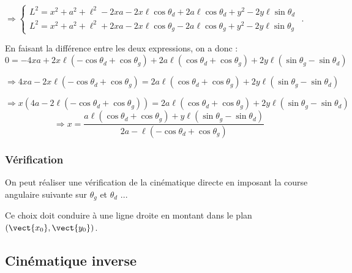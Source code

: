 \documentclass[10pt,fleqn]{article} %
\begin{document}
$
\Rightarrow
\left\{
\begin{array}{l}
L^2 = x^2  +a^2+\ell^2  -2xa -2x\ell\cos\theta_d+2a\ell\cos\theta_d  +  y^2 - 2y \ell   \sin\theta_d  \\
L^2 = x^2  +a^2+\ell^2 +2xa -2x\ell\cos\theta_g-2a\ell\cos\theta_g  +  y^2  -2y  \ell   \sin\theta_g 
\end{array}
\right.
$ .

En faisant la différence entre les deux expressions, on a donc : 
$$
0 =  -4xa +2x\ell \left(- \cos\theta_d+ \cos\theta_g\right)+2a\ell\left(\cos\theta_d+\cos\theta_g\right)  
  +2y  \ell   \left(\sin\theta_g -\sin\theta_d\right)
$$

$$
\Rightarrow 4xa -2x\ell \left(- \cos\theta_d+ \cos\theta_g\right) = 2a\ell\left(\cos\theta_d+\cos\theta_g\right)  
  +2y  \ell   \left(\sin\theta_g -\sin\theta_d\right)
$$

$$
\Rightarrow x\left(4a -2\ell \left(- \cos\theta_d+ \cos\theta_g\right)\right) = 2a\ell\left(\cos\theta_d+\cos\theta_g\right)  
  +2y  \ell   \left(\sin\theta_g -\sin\theta_d\right)
$$
$$
\Rightarrow x = \dfrac{a\ell\left(\cos\theta_d+\cos\theta_g\right)    +y  \ell   \left(\sin\theta_g -\sin\theta_d\right)}{2a -\ell \left(- \cos\theta_d+ \cos\theta_g\right)}
$$
\subsubsection{Vérification}
On peut réaliser une vérification de la cinématique directe en imposant la course angulaire suivante sur $\theta_g$ et $\theta_d$ ...

Ce choix doit conduire à une ligne droite en montant dans le plan $\left(\vect{x_0},\vect{y_0}\right)$.

\subsection{Cinématique inverse}
\end{document}
